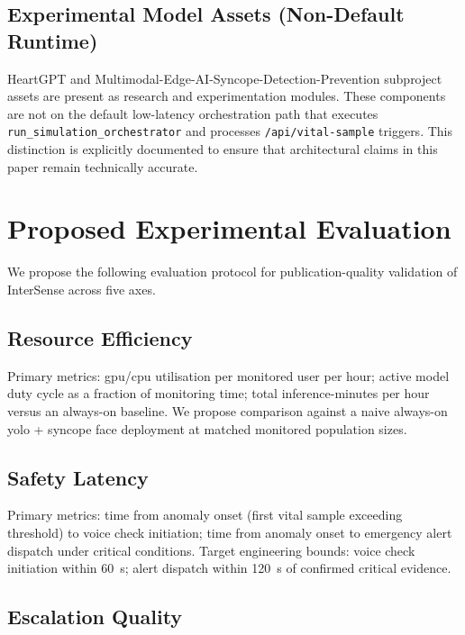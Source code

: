 \documentclass[10pt,twocolumn,a4paper]{article}
\begin{document}
\subsection{Experimental Model Assets (Non-Default Runtime)}

HeartGPT and Multimodal-Edge-AI-Syncope-Detection-Prevention
subproject assets are present as research and experimentation modules.
These components are not on the default low-latency orchestration path
that executes \texttt{run\_simulation\_orchestrator} and processes
\texttt{/api/vital-sample} triggers.  This distinction is explicitly
documented to ensure that architectural claims in this paper remain
technically accurate.

\section{Proposed Experimental Evaluation}

We propose the following evaluation protocol for publication-quality
validation of InterSense across five axes.

\subsection{Resource Efficiency}

Primary metrics: \gls{gpu}/\gls{cpu} utilisation per monitored user per
hour; active model duty cycle as a fraction of monitoring time; total
inference-minutes per hour versus an always-on baseline.  We propose
comparison against a naive always-on \gls{yolo} + syncope face
deployment at matched monitored population sizes.

\subsection{Safety Latency}

Primary metrics: time from anomaly onset (first vital sample exceeding
threshold) to voice check initiation; time from anomaly onset to
emergency alert dispatch under critical conditions.  Target engineering
bounds: voice check initiation within 60~s; alert dispatch within
120~s of confirmed critical evidence.

\subsection{Escalation Quality}
\end{document}
